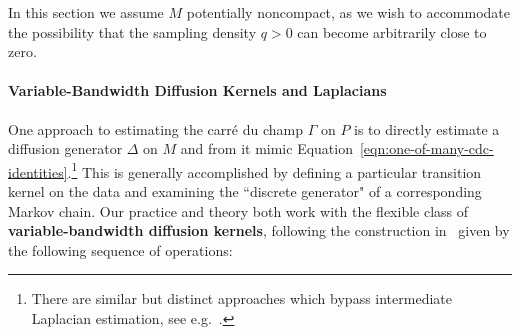 \documentclass{article}
\theoremstyle{remark}
\theoremstyle{plain}
\begin{document}
In this section we assume $M$ potentially noncompact, as we wish to accommodate the possibility that the sampling density $q>0$ can become arbitrarily close to zero. 

\paragraph{Variable-Bandwidth Diffusion Kernels and Laplacians}

One approach to estimating the carré du champ $\Gamma$ on $P$ is to directly estimate a diffusion generator $\Delta$ on \( M \) and from it mimic Equation~\ref{eqn:one-of-many-cdc-identities}.\footnote{There are similar but distinct approaches which bypass intermediate Laplacian estimation, see e.g.~\cite{bamberger2025carr, jonesComputingDiffusionGeometry2026}.} This is generally accomplished by defining a particular transition kernel on the data and examining the ``discrete generator" of a corresponding Markov chain. Our practice and theory both work with the flexible class of \textbf{variable-bandwidth diffusion kernels}, following the construction in~\cite{Berry2016} given by the following sequence of operations:
\end{document}
